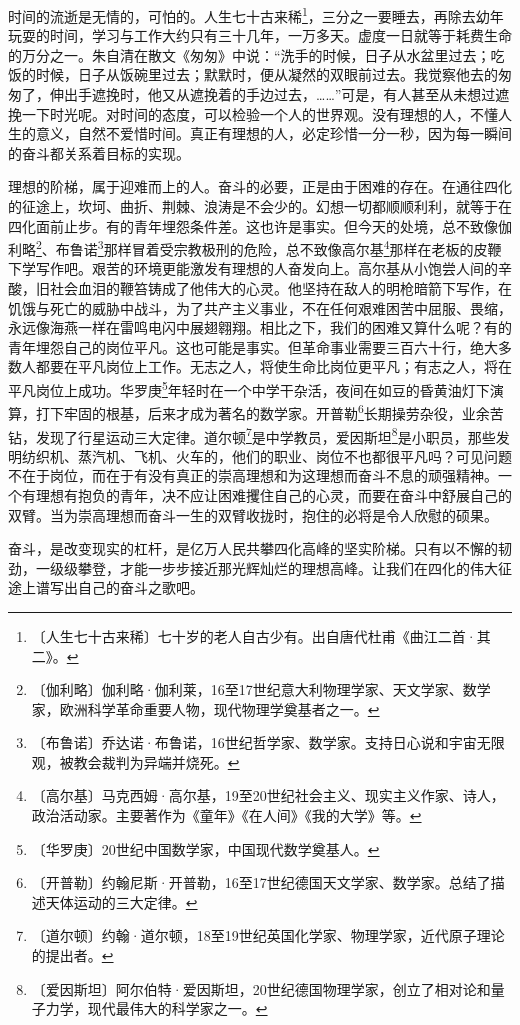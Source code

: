 \documentclass[12pt,UTF-8,openany]{ctexbook}
\begin{document}
\begin{large}
    时间的流逝是无情的，可怕的。人生七十古来稀\footnote{〔人生七十古来稀〕七十岁的老人自古少有。出自唐代杜甫《曲江二首·其二》。}，三分之一要睡去，再除去幼年玩耍的时间，学习与工作大约只有三十几年，一万多天。虚度一日就等于耗费生命的万分之一。朱自清在散文《匆匆》中说：“洗手的时候，日子从水盆里过去；吃饭的时候，日子从饭碗里过去；默默时，便从凝然的双眼前过去。我觉察他去的匆匆了，伸出手遮挽时，他又从遮挽着的手边过去，……”可是，有人甚至从未想过遮挽一下时光呢。对时间的态度，可以检验一个人的世界观。没有理想的人，不懂人生的意义，自然不爱惜时间。真正有理想的人，必定珍惜一分一秒，因为每一瞬间的奋斗都关系着目标的实现。
    
    理想的阶梯，属于迎难而上的人。奋斗的必要，正是由于困难的存在。在通往四化的征途上，坎坷、曲折、荆棘、浪涛是不会少的。幻想一切都顺顺利利，就等于在四化面前止步。有的青年埋怨条件差。这也许是事实。但今天的处境，总不致像伽利略\footnote{〔伽利略〕伽利略·伽利莱，16至17世纪意大利物理学家、天文学家、数学家，欧洲科学革命重要人物，现代物理学奠基者之一。}、布鲁诺\footnote{〔布鲁诺〕乔达诺·布鲁诺，16世纪哲学家、数学家。支持日心说和宇宙无限观，被教会裁判为异端并烧死。}那样冒着受宗教极刑的危险，总不致像高尔基\footnote{〔高尔基〕马克西姆·高尔基，19至20世纪社会主义、现实主义作家、诗人，政治活动家。主要著作为《童年》《在人间》《我的大学》等。}那样在老板的皮鞭下学写作吧。艰苦的环境更能激发有理想的人奋发向上。高尔基从小饱尝人间的辛酸，旧社会血泪的鞭笞铸成了他伟大的心灵。他坚持在敌人的明枪暗箭下写作，在饥饿与死亡的威胁中战斗，为了共产主义事业，不在任何艰难困苦中屈服、畏缩，永远像海燕一样在雷鸣电闪中展翅翱翔。相比之下，我们的困难又算什么呢？有的青年埋怨自己的岗位平凡。这也可能是事实。但革命事业需要三百六十行，绝大多数人都要在平凡岗位上工作。无志之人，将使生命比岗位更平凡；有志之人，将在平凡岗位上成功。华罗庚\footnote{〔华罗庚〕20世纪中国数学家，中国现代数学奠基人。}年轻时在一个中学干杂活，夜间在如豆的昏黄油灯下演算，打下牢固的根基，后来才成为著名的数学家。开普勒\footnote{〔开普勒〕约翰尼斯·开普勒，16至17世纪德国天文学家、数学家。总结了描述天体运动的三大定律。}长期操劳杂役，业余苦钻，发现了行星运动三大定律。道尔顿\footnote{〔道尔顿〕约翰·道尔顿，18至19世纪英国化学家、物理学家，近代原子理论的提出者。}是中学教员，爱因斯坦\footnote{〔爱因斯坦〕阿尔伯特·爱因斯坦，20世纪德国物理学家，创立了相对论和量子力学，现代最伟大的科学家之一。}是小职员，那些发明纺织机、蒸汽机、飞机、火车的，他们的职业、岗位不也都很平凡吗？可见问题不在于岗位，而在于有没有真正的崇高理想和为这理想而奋斗不息的顽强精神。一个有理想有抱负的青年，决不应让困难攫住自己的心灵，而要在奋斗中舒展自己的双臂。当为崇高理想而奋斗一生的双臂收拢时，抱住的必将是令人欣慰的硕果。
    
    奋斗，是改变现实的杠杆，是亿万人民共攀四化高峰的坚实阶梯。只有以不懈的韧劲，一级级攀登，才能一步步接近那光辉灿烂的理想高峰。让我们在四化的伟大征途上谱写出自己的奋斗之歌吧。
    
\end{large}
\end{document}
